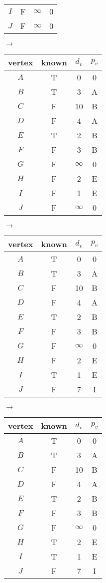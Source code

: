 \documentclass[12pt]{article}
\begin{document}
\begin{center}
\begin{tabular}{ c c c c }
$I$ & F & $\infty$ & 0 \\
$J$ & F & $\infty$ & 0 \\
\end{tabular}
$\rightarrow$
\begin{tabular}{ c c c c } 
vertex & known & $d_v$ & $p_v$ \\
 \hline
$A$ & T & 0 & 0 \\
$B$ & T & 3 & A \\
$C$ & F & 10 & B \\
$D$ & F & 4 & A \\
$E$ & T & 2 & B \\
$F$ & F & 3 & B \\
$G$ & F & $\infty$ & 0 \\
$H$ & F & 2 & E \\
$I$ & F & 1 & E \\
$J$ & F & $\infty$ & 0 \\
\end{tabular}
$\rightarrow$
\begin{tabular}{ c c c c } 
vertex & known & $d_v$ & $p_v$ \\
 \hline
$A$ & T & 0 & 0 \\
$B$ & T & 3 & A \\
$C$ & F & 10 & B \\
$D$ & F & 4 & A \\
$E$ & T & 2 & B \\
$F$ & F & 3 & B \\
$G$ & F & $\infty$ & 0 \\
$H$ & F & 2 & E \\
$I$ & T & 1 & E \\
$J$ & F & 7 & I \\
\end{tabular}
$\rightarrow$
\begin{tabular}{ c c c c } 
vertex & known & $d_v$ & $p_v$ \\
 \hline
$A$ & T & 0 & 0 \\
$B$ & T & 3 & A \\
$C$ & F & 10 & B \\
$D$ & F & 4 & A \\
$E$ & T & 2 & B \\
$F$ & F & 3 & B \\
$G$ & F & $\infty$ & 0 \\
$H$ & T & 2 & E \\
$I$ & T & 1 & E \\
$J$ & F & 7 & I \\
\end{tabular}

\end{center}
\end{document}
